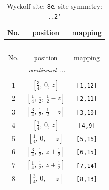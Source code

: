 \documentclass[fleqn,8pt]{jsarticle}
\begin{document}
\renewcommand{\arraystretch}{1.2}
\begin{longtable}{ccc}
\caption{Wyckoff site: {\tt 8e}, site symmetry: {\tt ..2'}}
 \\
 \hline \hline
No. & position & mapping \\ \hline \endfirsthead

\multicolumn{2}{l}{\tablename\ \thetable{}} \\
 \hline \hline
No. & position & mapping \\ \hline \endhead

 \hline \hline
\multicolumn{2}{r}{\footnotesize\it continued ...} \\ \endfoot

 \hline \hline
\multicolumn{2}{r}{} \\ \endlastfoot

1 & $\left[ \frac{3}{4},\, 0,\, z \right]$ & {\tt [1,12]} \\ \hline
2 & $\left[ \frac{1}{4},\, \frac{1}{2},\, \frac{1}{2} - z \right]$ & {\tt [2,11]} \\ \hline
3 & $\left[ \frac{3}{4},\, \frac{1}{2},\, \frac{1}{2} - z \right]$ & {\tt [3,10]} \\ \hline
4 & $\left[ \frac{1}{4},\, 0,\, z \right]$ & {\tt [4,9]} \\ \hline
5 & $\left[ \frac{1}{4},\, 0,\, - z \right]$ & {\tt [5,16]} \\ \hline
6 & $\left[ \frac{3}{4},\, \frac{1}{2},\, z + \frac{1}{2} \right]$ & {\tt [6,15]} \\ \hline
7 & $\left[ \frac{1}{4},\, \frac{1}{2},\, z + \frac{1}{2} \right]$ & {\tt [7,14]} \\ \hline
8 & $\left[ \frac{3}{4},\, 0,\, - z \right]$ & {\tt [8,13]} \\
\end{longtable}
\renewcommand{\arraystretch}{1.2}
\end{document}
